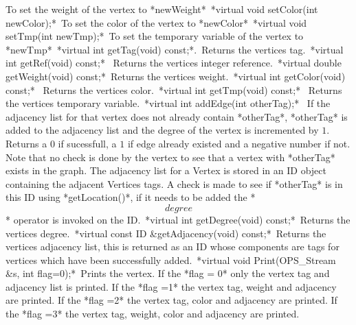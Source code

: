To set the weight of the vertex to *newWeight*\
*virtual void setColor(int newColor);*\
To set the color of the vertex to *newColor*\
*virtual void setTmp(int newTmp);*\
To set the temporary variable of the vertex to *newTmp*\
*virtual int getTag(void) const;*.\
Returns the vertices tag.\
*virtual int getRef(void) const;* \
Returns the vertices integer reference.\
*virtual double getWeight(void) const;*\
Returns the vertices weight.\
*virtual int getColor(void) const;* \
Returns the vertices color.\
*virtual int getTmp(void) const;* \
Returns the vertices temporary variable.\
*virtual int addEdge(int otherTag);* \
If the adjacency list for that vertex does not already contain
*otherTag*, *otherTag* is added to the adjacency list and the degree of
the vertex is incremented by $1$. Returns a $0$ if sucessfull, a $1$ if
edge already existed and a negative number if not. Note that no check is
done by the vertex to see that a vertex with *otherTag* exists in the
graph. The adjacency list for a Vertex is stored in an ID object
containing the adjacent Vertices tags. A check is made to see if
*otherTag* is in this ID using *getLocation()*, if it needs to be added
the *\[degree\]* operator is invoked on the ID.\
*virtual int getDegree(void) const;*\
Returns the vertices degree.\
*virtual const ID &getAdjacency(void) const;*\
Returns the vertices adjacency list, this is returned as an ID whose
components are tags for vertices which have been successfully added.\
*virtual void Print(OPS_Stream &s, int flag=0);*\
Prints the vertex. If the *flag = 0* only the vertex tag and adjacency
list is printed. If the *flag =1* the vertex tag, weight and adjacency
are printed. If the *flag =2* the vertex tag, color and adjacency are
printed. If the *flag =3* the vertex tag, weight, color and adjacency
are printed.\
